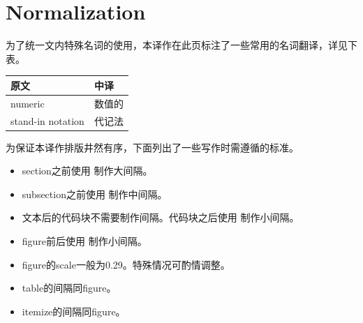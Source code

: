 \chapter{Normalization}

为了统一文内特殊名词的使用，本译作在此页标注了一些常用的名词翻译，详见下表。

\begin{table}[h]
    \footnotesize
    \begin{tabularx}{\linewidth}{X X}
        \toprule
        \textbf{原文} & \textbf{中译}\\
        \midrule
        numeric & 数值的 \\
        stand-in notation & 代记法 \\
        \bottomrule
    \end{tabularx}
\end{table}

为保证本译作排版井然有序，下面列出了一些写作时需遵循的标准。

\medskip
\begin{itemize}
    \item section之前使用  制作大间隔。
    \item subsection之前使用  制作中间隔。
    \item 文本后的代码块不需要制作间隔。代码块之后使用  制作小间隔。
    \item figure前后使用  制作小间隔。
    \item figure的scale一般为0.29。特殊情况可酌情调整。
    \item table的间隔同figure。
    \item itemize的间隔同figure。
\end{itemize}